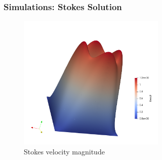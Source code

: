 \documentclass{beamer}
\theoremstyle{definition}
\begin{document}
\begin{frame}
\frametitle{Simulations:  Stokes Solution}
\vspace{-8mm}
\begin{figure}[H]
	\centering
	\includegraphics[width=7cm]{stokes_cg_velocities}
	\caption{Stokes velocity magnitude}
	\label{fig_stokes_sol}
\end{figure}
\end{frame}  
\end{document}
